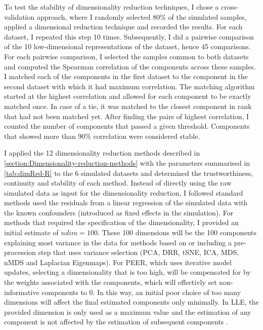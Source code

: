 To test the stability of dimensionality reduction techniques, I chose a cross-validation approach, where I randomly selected \num{80}\% of the simulated samples, applied a dimensional reduction technique and recorded the results. For each dataset, I repeated this step \num{10} times. Subsequently, I did a pairwise comparison of the \num{10} low-dimensional representations of the dataset, hence \num{45} comparisons. For each pairwise comparison, I selected the samples common to both datasets and computed the Spearman correlation of the components across these samples. I matched each of the components in the first dataset to the component in the second dataset with which it had maximum correlation. The matching algorithm started at the highest correlation and allowed for each component to be exactly matched once. In case of a tie, it was matched to the closest component in rank that had not been matched yet. After finding the pairs of highest correlation, I counted the number of components that passed a given threshold. Components that showed more than \num{90}\% correlation were considered stable. 

I applied the \num{12} dimensionality reduction methods described in \cref{section:Dimensionality-reduction-methods} with the parameters summarised in \cref{tab:dimRed-R} to the \num{6} simulated datasets and determined the trustworthiness, continuity and stability of each method.  Instead of directly using the raw simulated data as input for the dimensionality reduction, I followed standard methods used the residuals from a linear regression of the simulated data with the known confounders (introduced as fixed effects in the simulation).  For methods that required the specification of the dimensionality, I provided an initial estimate of \(ndim=100\).  These \num{100} dimensions  will be the \num{100} components explaining most variance in the data for methods based on or including a pre-procession step that uses variance selection (PCA, DRR, tSNE, ICA, MDS, nMDS and Laplacian Eigenmaps). For PEER, which uses iterative model updates, selecting a dimensionality that is too high, will be compensated for by the weights associated with the components, which will effectivly set non-informative components to \num{0}. In this way, an initial poor choice of too many dimensions will affect the final estimated components only minimally. In LLE, the provided dimension is only used as a maximum value and the estimation of any component is not affected by the estimation of subsequent components \citep{Roweis2000,Kayo2006}.


